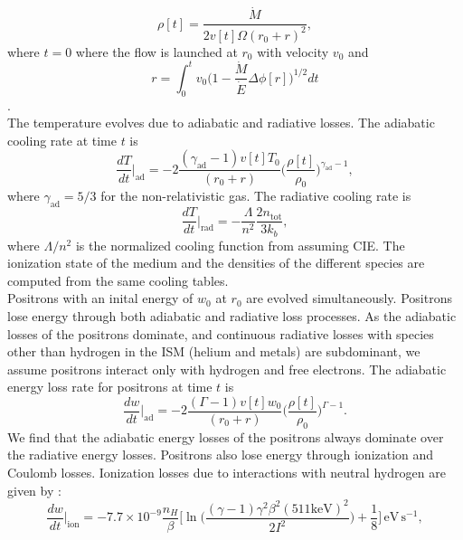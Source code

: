 \documentclass[a4paper,fleqn,usenatbib]{mnras}
\begin{document}
\begin{equation}
\rho[t] = \frac{\dot{M}}{2v[t]\Omega(r_0 + r)^2}, 
\end{equation}
where $t=0$ where the flow is launched at $r_0$ with velocity $v_0$ and
\begin{equation}
	r = \int_{0}^{t}v_0\bigg(1-\frac{\dot{M}}{\dot{E}}\Delta\phi[r]\bigg)^{1/2} dt
\end{equation}.\\
The temperature evolves due to adiabatic and radiative losses. The adiabatic cooling rate at time $t$ is
\begin{equation}
\frac{dT}{dt}\bigg|_\mathrm{ad}=- 2\frac{(\gamma_\mathrm{ad}-1)v[t]T_0}{(r_0+r)}\bigg(\frac{\rho[t]}{\rho_0}\bigg)^{\gamma_\mathrm{ad}-1},
\end{equation}
where $\gamma_\mathrm{ad}=5/3$ for the non-relativistic gas. 
The radiative cooling rate is
\begin{equation} 
\frac{dT}{dt}\bigg|_\mathrm{rad} = -\frac{\Lambda}{n^2}\frac{2n_\mathrm{tot}}{3k_b},
\end{equation}
where $\Lambda/n^2$ is the normalized cooling function from \cite{MAPPINGS} assuming CIE. The ionization state of the medium and the densities of the different species are computed from the same cooling tables.\\
Positrons with an inital energy of $w_0$ at $r_0$ are evolved simultaneously. Positrons lose energy through both adiabatic and radiative loss processes. As the adiabatic losses of the positrons dominate, and continuous radiative losses with species other than hydrogen in the ISM (helium and metals) are subdominant, we assume positrons interact only with hydrogen and free electrons. The adiabatic energy loss rate for positrons at time $t$ is
\begin{equation}
\frac{dw}{dt}\bigg|_\mathrm{ad}=- 2\frac{(\Gamma-1)v[t]w_0}{(r_0+r)}\bigg(\frac{\rho[t]}{\rho_0}\bigg)^{\Gamma-1}.
\end{equation}
We find that the adiabatic energy losses of the positrons always dominate over the radiative energy losses. Positrons also lose energy through ionization and Coulomb losses. Ionization losses due to interactions with neutral hydrogen are given by \citep{Ginzburg79}:
\begin{equation}
\frac{dw}{dt}\bigg|_{\mathrm{ion}} = -7.7\times10^{-9}\frac{n_{H}}{\beta}\biggl[ \ln\bigg(\frac{(\gamma-1)\gamma^2\beta^2 (511 \mathrm{keV})^2}{2I^2}\bigg)+\frac{1}{8}\biggl]\,\mathrm{eV\,s^{-1}},
\end{equation}
\end{document}
